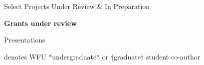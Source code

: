 \documentclass[11pt,letterpaper]{article} %
\begin{document}






\begin{rSection}{ \textrm{Select Projects Under Review \& In Preparation}}

{\large \textbf{Grants under review}}
\begin{etaremune}

\end{etaremune}%

%

%
\end{rSection}
%
\begin{rSection}{\textrm{Presentations}} %
%
\vspace{-1mm}\begin{center}\footnotesize{denotes WFU *undergraduate* or $\dagger$graduate$\dagger$ student co-author}\end{center}\vspace{-5mm}


\end{rSection}
\end{document}
